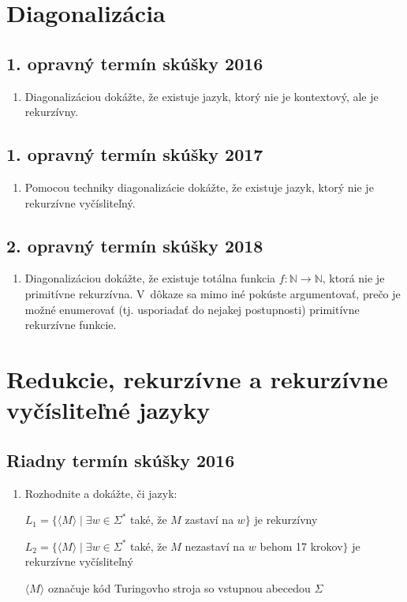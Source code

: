 \documentclass[11pt,a4paper]{article}
\begin{document}
	\section{Diagonalizácia}
	
		\subsection{1. opravný termín skúšky 2016}
		
		\begin{enumerate}
			\item Diagonalizáciou dokážte, že existuje jazyk, ktorý nie je kontextový, ale je rekurzívny.
		\end{enumerate}

		\subsection{1. opravný termín skúšky 2017}

		\begin{enumerate}
			\item Pomocou techniky diagonalizácie dokážte, že existuje jazyk, ktorý nie je rekurzívne vyčísliteľný.
		\end{enumerate}
	
		\subsection{2. opravný termín skúšky 2018}
		
		\begin{enumerate}
			\item  Diagonalizáciou dokážte, že existuje totálna funkcia $f: \mathbb{N} \rightarrow \mathbb{N}$, ktorá nie je primitívne rekurzívna. V~dôkaze sa mimo iné pokúste argumentovať, prečo je možné enumerovať (tj. usporiadať do nejakej postupnosti) primitívne rekurzívne funkcie.
		\end{enumerate}
	
	\section{Redukcie, rekurzívne a rekurzívne vyčísliteľné jazyky}
	
		\subsection{Riadny termín skúšky 2016}
		
		\begin{enumerate}
			\item Rozhodnite a dokážte, či jazyk:
			
			$L_1 = \{\langle M \rangle \mid \exists w \in \Sigma^*$ také, že $M$ zastaví na $w\}$ je rekurzívny
			
			$L_2 = \{\langle M \rangle \mid \exists w \in \Sigma^*$ také, že $M$ nezastaví na $w$ behom 17 krokov$\}$ je rekurzívne vyčísliteľný
			
			$\langle M \rangle$ označuje kód Turingovho stroja so vstupnou abecedou $\Sigma$
		\end{enumerate}	
		
\end{document}
